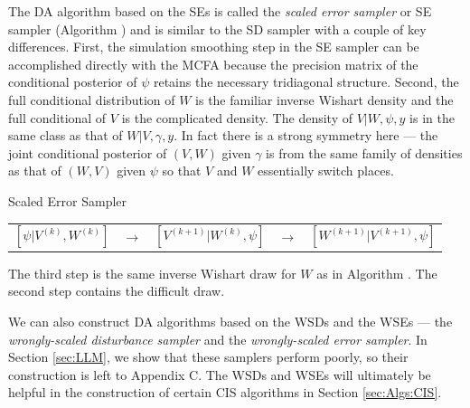 \documentclass[12pt]{article}
\begin{document}
The DA algorithm based on the SEs is called the {\it scaled error sampler} or SE sampler (Algorithm ) and is similar to the SD sampler with a couple of key differences. First, the simulation smoothing step in the SE sampler can be accomplished directly with the MCFA because the precision matrix of the conditional posterior of $\psi$ retains the necessary tridiagonal structure. Second, the full conditional distribution of $W$ is the familiar inverse Wishart density and the full conditional of $V$ is the complicated density. The density of $V|W,\psi,y$ is in the same class as that of $W|V,\gamma,y$. In fact there is a strong symmetry here --- the joint conditional posterior of $(V,W)$ given $\gamma$ is from the same family of densities as that of $(W,V)$ given $\psi$ so that $V$ and $W$ essentially switch places.
\begin{alg*}[SE]Scaled Error Sampler\label{alg:DLMerror}
{\small \vspace{-.5cm}
\begin{center}
\begin{tabular}{lllll}
$[\psi|V^{(k)},W^{(k)}]$ & $\to$ & $[V^{(k+1)}|W^{(k)},\psi]$ & $\to$ & $[W^{(k+1)}|V^{(k+1)},\psi]$
\end{tabular}
\end{center}
}
\end{alg*}
\noindent The third step is the same inverse Wishart draw for $W$ as in Algorithm . The second step contains the difficult draw.

We can also construct DA algorithms based on the WSDs and the WSEs --- the {\it wrongly-scaled disturbance sampler} and the {\it wrongly-scaled error sampler}. In Section \ref{sec:LLM}, we show that these samplers perform poorly, so their construction is left to Appendix C. The WSDs and WSEs will ultimately be helpful in the construction of certain CIS algorithms in Section \ref{sec:Algs:CIS}.
\end{document}
